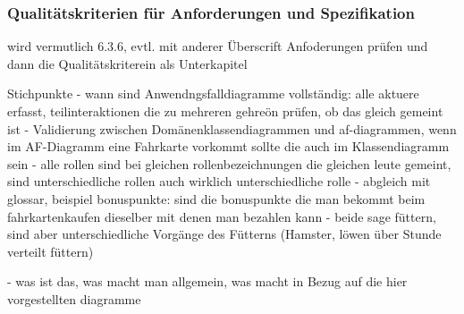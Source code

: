 \subsubsection{Qualitätskriterien für Anforderungen und Spezifikation}
\label{sec:Kap-6.3.5.3}

wird vermutlich 6.3.6, evtl. mit anderer Überscrift Anfoderungen prüfen und dann die Qualitätskriterein als Unterkapitel

Stichpunkte
- wann sind Anwendngsfalldiagramme vollständig: alle aktuere erfasst, teilinteraktionen die zu mehreren gehreön prüfen, ob das gleich gemeint ist
- Validierung zwischen Domänenklassendiagrammen und af-diagrammen, wenn im AF-Diagramm eine Fahrkarte vorkommt sollte die auch im Klassendiagramm sein 
- alle rollen sind bei gleichen rollenbezeichnungen die gleichen leute gemeint, sind unterschiedliche rollen auch wirklich unterschiedliche rolle
- abgleich mit glossar, beispiel bonuspunkte: sind die bonuspunkte die man bekommt beim fahrkartenkaufen dieselber mit denen man bezahlen kann
- beide sage füttern, sind aber unterschiedliche Vorgänge des Fütterns (Hamster, löwen über Stunde verteilt füttern)

- was ist das, was macht man allgemein, was macht in Bezug auf die hier vorgestellten diagramme